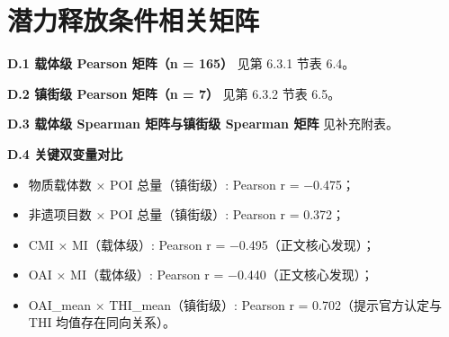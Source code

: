 \chapter{潜力释放条件相关矩阵}\label{ux6f5cux529bux91caux653eux6761ux4ef6ux76f8ux5173ux77e9ux9635}

\textbf{D.1 载体级 Pearson 矩阵（n = 165）} 见第 6.3.1 节表 6.4。

\textbf{D.2 镇街级 Pearson 矩阵（n = 7）} 见第 6.3.2 节表 6.5。

\textbf{D.3 载体级 Spearman 矩阵与镇街级 Spearman 矩阵} 见补充附表。

\textbf{D.4 关键双变量对比}

\begin{itemize}
\item
  物质载体数 × POI 总量（镇街级）: Pearson r = −0.475；
\item
  非遗项目数 × POI 总量（镇街级）: Pearson r = 0.372；
\item
  CMI × MI（载体级）: Pearson r = −0.495（正文核心发现）；
\item
  OAI × MI（载体级）: Pearson r = −0.440（正文核心发现）；
\item
  OAI\_mean × THI\_mean（镇街级）: Pearson r = 0.702（提示官方认定与 THI 均值存在同向关系）。
\end{itemize}
